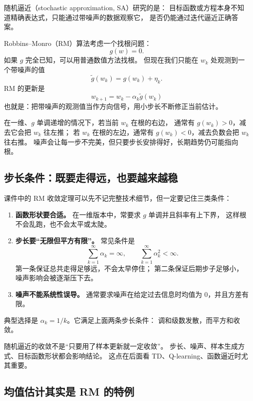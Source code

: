 \documentclass[11pt,a4paper,fontset=fandol]{ctexart}
\begin{document}
随机逼近（stochastic approximation, SA）研究的是：
目标函数或方程本身不知道精确表达式，只能通过带噪声的数据观察它，
是否仍能通过迭代逼近正确答案。

Robbins--Monro（RM）算法考虑一个找根问题：
\[
g(w)=0.
\]
如果 \(g\) 完全已知，可以用普通数值方法找根。
但现在我们只能在 \(w_k\) 处观测到一个带噪声的值
\[
\tilde g(w_k)=g(w_k)+\eta_k.
\]
RM 的更新是
\[
\boxed{
w_{k+1}=w_k-\alpha_k\tilde g(w_k)
}
\]
也就是：把带噪声的观测值当作方向信号，用小步长不断修正当前估计。

\begin{intuitionbox}[为什么是减号？]
在一维、\(g\) 单调递增的情况下，若当前 \(w_k\) 在根的右边，
通常有 \(g(w_k)>0\)，减去它会把 \(w_k\) 往左推；
若 \(w_k\) 在根的左边，通常有 \(g(w_k)<0\)，减去负数会把 \(w_k\) 往右推。
噪声会让每一步不完美，但只要步长安排得好，长期趋势仍可能指向根。
\end{intuitionbox}

\subsection{步长条件：既要走得远，也要越来越稳}

课件中的 RM 收敛定理可以先不记完整技术细节，但一定要记住三类条件：

\begin{enumerate}
  \item \textbf{函数形状要合适。}
  在一维版本中，常要求 \(g\) 单调并且斜率有上下界，
  这样根不会乱跑，也不会太平或太陡。
  \item \textbf{步长要“无限但平方有限”。}
  常见条件是
  \[
  \sum_{k=1}^{\infty}\alpha_k=\infty,
  \qquad
  \sum_{k=1}^{\infty}\alpha_k^2<\infty.
  \]
  第一条保证总共走得足够远，不会太早停住；
  第二条保证后期步子足够小，噪声影响会被逐渐压下去。
  \item \textbf{噪声不能系统性误导。}
  通常要求噪声在给定过去信息时均值为 \(0\)，并且方差有限。
\end{enumerate}

典型选择是 \(\alpha_k=1/k\)。它满足上面两条步长条件：
调和级数发散，而平方和收敛。

\begin{warningbox}
随机逼近的收敛不是“只要用了样本更新就一定收敛”。
步长、噪声、样本生成方式、目标函数形状都会影响结论。
这点在后面看 TD、Q-learning、函数逼近时尤其重要。
\end{warningbox}

\subsection{均值估计其实是 RM 的特例}
\end{document}

